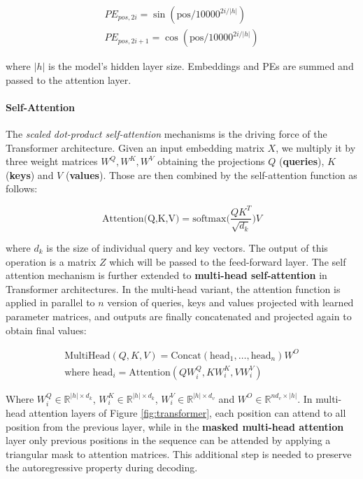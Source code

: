 \documentclass[a4paper, nobind]{templates/ociamthesis}
\begin{document}
\begin{align} 
PE_{pos, 2i} = \sin(\text{pos}/10000^{2i/|h|}) \\
PE_{pos, 2i + 1} = \cos(\text{pos}/10000^{2i/|h|})
\end{align}

where \(|h|\) is the model's hidden layer size. Embeddings and PEs are summed and passed to the attention layer.

\paragraph{Self-Attention} The \emph{scaled dot-product self-attention} mechanisms is the driving force of the Transformer architecture. Given an input embedding matrix \(X\), we multiply it by three weight matrices \(W^Q, W^K, W^V\) obtaining the projections \(Q\) (\textbf{queries}), \(K\) (\textbf{keys}) and \(V\) (\textbf{values}). Those are then combined by the self-attention function as follows:

\begin{equation}
\text{Attention(Q,K,V)} = \text{softmax}\Big ( \frac{QK^T}{\sqrt{d_k}}\Big)V
\end{equation}

where \(d_k\) is the size of individual query and key vectors. The output of this operation is a matrix \(Z\) which will be passed to the feed-forward layer. The self attention mechanism is further extended to \textbf{multi-head self-attention} in Transformer architectures. In the multi-head variant, the attention function is applied in parallel to \(n\) version of queries, keys and values projected with learned parameter matrices, and outputs are finally concatenated and projected again to obtain final values:

\begin{align}
\text{MultiHead}(Q,K,V) = \text{Concat}(\text{head}_1,\dots, \text{head}_n)W^O \\
\text{where } \text{head}_i = \text{Attention}(QW_i^Q,KW_i^K,VW_i^V)
\end{align}

Where \(W_i^Q \in \mathbb{R}^{|h| \times d_k}\), \(W_i^K \in \mathbb{R}^{|h| \times d_k}\), \(W_i^V \in \mathbb{R}^{|h| \times d_v}\) and \(W^O \in \mathbb{R}^{nd_v \times |h|}\). In multi-head attention layers of Figure \ref{fig:transformer}, each position can attend to all position from the previous layer, while in the \textbf{masked multi-head attention} layer only previous positions in the sequence can be attended by applying a triangular mask to attention matrices. This additional step is needed to preserve the autoregressive property during decoding.
\end{document}
